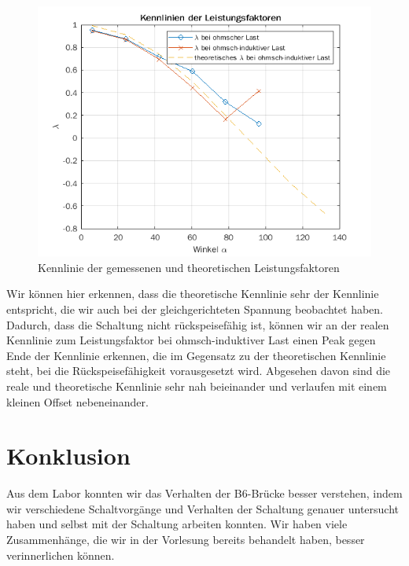\documentclass{article}
\begin{document}
\begin{figure}[h]
  \centering
  \includegraphics[width=.75\textwidth]{../assets/images/GEP2/lambda_alpha.png}
  \caption{Kennlinie der gemessenen und theoretischen Leistungsfaktoren}
  \label{fig:lambda}
\end{figure}

Wir können hier erkennen, dass die theoretische Kennlinie sehr der Kennlinie entspricht, die wir auch bei der gleichgerichteten Spannung beobachtet haben. Dadurch, dass die Schaltung nicht rückspeisefähig ist, können wir an der realen Kennlinie zum Leistungsfaktor bei ohmsch-induktiver Last einen Peak gegen Ende der Kennlinie erkennen, die im Gegensatz zu der theoretischen Kennlinie steht, bei die Rückspeisefähigkeit vorausgesetzt wird. Abgesehen davon sind die reale und theoretische Kennlinie sehr nah beieinander und verlaufen mit einem kleinen Offset nebeneinander.
\section{Konklusion}
\label{sec:konklusion}

Aus dem Labor konnten wir das Verhalten der B6-Brücke besser verstehen, indem wir verschiedene Schaltvorgänge und Verhalten der Schaltung genauer untersucht haben und selbst mit der Schaltung arbeiten konnten. Wir haben viele Zusammenhänge, die wir in der Vorlesung bereits behandelt haben, besser verinnerlichen können.
\end{document}
